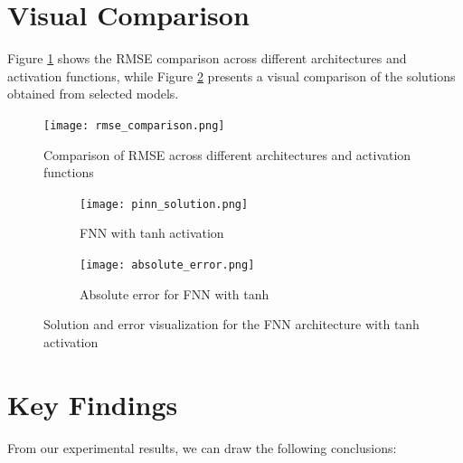 \documentclass[12pt,a4paper]{report}
\begin{document}
	\section{Visual Comparison}
	
	Figure \ref{fig:architecture_rmse} shows the RMSE comparison across different architectures and activation functions, while Figure \ref{fig:architecture_solution} presents a visual comparison of the solutions obtained from selected models.
	
	\begin{figure}[H]
		\centering
		\texttt{[image: rmse\_comparison.png]}
		\caption{Comparison of RMSE across different architectures and activation functions}
		\label{fig:architecture_rmse}
	\end{figure}
	
	\begin{figure}[H]
		\centering
		\begin{subfigure}{0.45\textwidth}
			\texttt{[image: pinn\_solution.png]}
			\caption{FNN with tanh activation}
		\end{subfigure}
		\hfill
		\begin{subfigure}{0.45\textwidth}
			\texttt{[image: absolute\_error.png]}
			\caption{Absolute error for FNN with tanh}
		\end{subfigure}
		\caption{Solution and error visualization for the FNN architecture with tanh activation}
		\label{fig:architecture_solution}
	\end{figure}
	
	\section{Key Findings}
	
	From our experimental results, we can draw the following conclusions:
	
\end{document}
